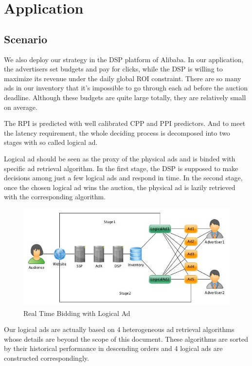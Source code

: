 \documentclass{article}
\begin{document}
\section{Application} \label{Application}

\subsection{Scenario}

We also deploy our strategy in the DSP platform of Alibaba.
In our application, the advertisers set budgets and pay for clicks, while the DSP is willing to maximize its revenue under the daily global ROI constraint.
There are so many ads in our inventory that it's impossible to go through each ad before the auction deadline.
Although these budgets are quite large totally, they are relatively small on average.

The RPI is predicted with well calibrated CPP and PPI predictors.
And to meet the latency requirement, the whole deciding process is decomposed into two stages with so called logical ad.

Logical ad should be seen as the proxy of the physical ads and is binded with specific ad retrieval algorithm.
In the first stage, the DSP is supposed to make decisions among just a few logical ads and respond in time.
In the second stage, once the chosen logical ad wins the auction, the physical ad is lazily retrieved with the corresponding algorithm.

\begin{figure}[!h]
\centering
\includegraphics[width=1.0\linewidth]{./LogicalAd.jpg}
\caption{Real Time Bidding with Logical Ad}
\end{figure}

Our logical ads are actually based on 4 heterogeneous ad retrieval algorithms whose details are beyond the scope of this document.
These algorithms are sorted by their historical performance in descending orders and 4 logical ads are constructed correspondingly.
\end{document}
